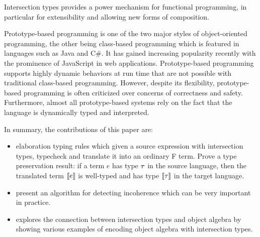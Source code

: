 Intersection types provides a power mechanism for functional programming, in
particular for extensibility and allowing new forms of composition.

Prototype-based programming is one of the two major styles of object-oriented
programming, the other being class-based programming which is featured in
languages such as Java and C\#. It has gained increasing popularity recently
with the prominence of JavaScript in web applications. Prototype-based
programming supports highly dynamic behaviors at run time that are not possible
with traditional class-based programming. However, despite its flexibility,
prototype-based programming is often criticized over concerns of correctness and
safety. Furthermore, almost all prototype-based systems rely on the fact that
the language is dynamically typed and interpreted.

In summary, the contributions of this paper are:

\begin{itemize}

\item{elaboration typing rules which given a source expression with intersection
    types, typecheck and translate it into an ordinary F term. Prove a type
    preservation result: if a term $ e $ has type $ \tau $ in the source language,
    then the translated term $ \llbracket {e} \rrbracket $ is well-typed and has type $ \llbracket {\tau} \rrbracket $ in the
    target language.}

\item{present an algorithm for detecting incoherence which can be very important
    in practice.}

\item{explores the connection between intersection types and object algebra by
    showing various examples of encoding object algebra with intersection
    types.}

\end{itemize}
